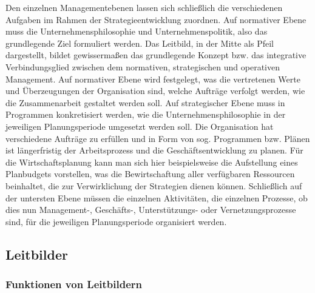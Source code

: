 \documentclass[
  letterpaper,
]{book}
\begin{document}
Den einzelnen Managementebenen lassen sich schließlich die verschiedenen
Aufgaben im Rahmen der Strategieentwicklung zuordnen. Auf normativer
Ebene muss die Unternehmensphilosophie und Unternehmenspolitik, also das
grundlegende Ziel formuliert werden. Das Leitbild, in der Mitte als
Pfeil dargestellt, bildet gewissermaßen das grundlegende Konzept bzw.
das integrative Verbindungsglied zwischen dem normativen, strategischen
und operativen Management. Auf normativer Ebene wird festgelegt, was die
vertretenen Werte und Überzeugungen der Organisation sind, welche
Aufträge verfolgt werden, wie die Zusammenarbeit gestaltet werden soll.
Auf strategischer Ebene muss in Programmen konkretisiert werden, wie die
Unternehmensphilosophie in der jeweiligen Planungsperiode umgesetzt
werden soll. Die Organisation hat verschiedene Aufträge zu erfüllen und
in Form von sog. Programmen bzw. Plänen ist längerfristig der
Arbeitsprozess und die Geschäftsentwicklung zu planen. Für die
Wirtschaftsplanung kann man sich hier beispielsweise die Aufstellung
eines Planbudgets vorstellen, was die Bewirtschaftung aller verfügbaren
Ressourcen beinhaltet, die zur Verwirklichung der Strategien dienen
können. Schließlich auf der untersten Ebene müssen die einzelnen
Aktivitäten, die einzelnen Prozesse, ob dies nun Management-,
Geschäfts-, Unterstützungs- oder Vernetzungsprozesse sind, für die
jeweiligen Planungsperiode organisiert werden.

\subsection{Leitbilder}\label{leitbilder}

\subsubsection{Funktionen von
Leitbildern}\label{funktionen-von-leitbildern}
\end{document}
